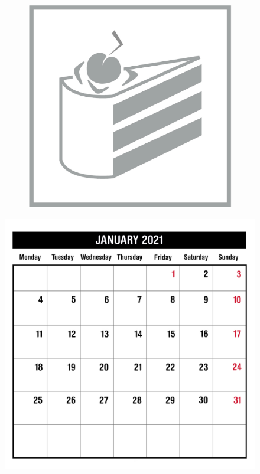 \begin{figure}[H]
\begin{subfigure}[l]{0.195\linewidth}
  \end{subfigure}
  \begin{subfigure}[l]{0.195\linewidth}
    \includegraphics[width=\textwidth]{Sources/PortalIcons/d10.jpg}
  \end{subfigure}
\end{figure}


\newpage
\begin{figure}[H]
    \includegraphics[width=\textwidth]{Sources/MonthViews/January21.jpg}
\end{figure}

